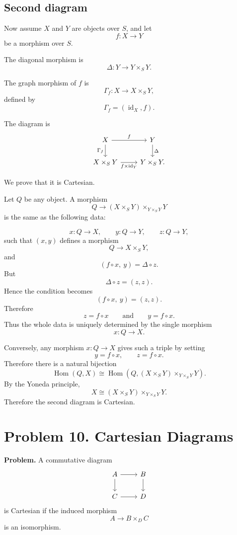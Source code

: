 \documentclass[12pt,a4paper]{article}
\theoremstyle{notespace}
\begin{document}
\subsection{Second diagram}

Now assume \(X\) and \(Y\) are objects over \(S\), and let
\[
f:X\longrightarrow Y
\]
be a morphism over \(S\).

The diagonal morphism is
\[
\Delta:Y\longrightarrow Y\times_S Y.
\]

The graph morphism of \(f\) is
\[
\Gamma_f:X\longrightarrow X\times_S Y,
\]
defined by
\[
\Gamma_f=(\operatorname{id}_X,f).
\]

The diagram is
\[
\begin{tikzcd}
	X \arrow[r,"f"] \arrow[d,"\Gamma_f"']
	&
	Y \arrow[d,"\Delta"]
	\\
	X\times_S Y \arrow[r,"f\times \operatorname{id}_Y"']
	&
	Y\times_S Y.
\end{tikzcd}
\]

We prove that it is Cartesian.

Let \(Q\) be any object. A morphism
\[
Q\longrightarrow
(X\times_S Y)\times_{Y\times_S Y}Y
\]
is the same as the following data:

\[
x:Q\to X,
\qquad
y:Q\to Y,
\qquad
z:Q\to Y,
\]
such that \((x,y)\) defines a morphism
\[
Q\to X\times_S Y,
\]
and
\[
(f\circ x,\ y)=\Delta\circ z.
\]
But
\[
\Delta\circ z=(z,z).
\]
Hence the condition becomes
\[
(f\circ x,\ y)=(z,z).
\]
Therefore
\[
z=f\circ x
\qquad\text{and}\qquad
y=f\circ x.
\]
Thus the whole data is uniquely determined by the single morphism
\[
x:Q\to X.
\]

Conversely, any morphism \(x:Q\to X\) gives such a triple by setting
\[
y=f\circ x,
\qquad
z=f\circ x.
\]
Therefore there is a natural bijection
\[
\operatorname{Hom}(Q,X)
\cong
\operatorname{Hom}
\left(
Q,(X\times_S Y)\times_{Y\times_S Y}Y
\right).
\]
By the Yoneda principle,
\[
X
\cong
(X\times_S Y)\times_{Y\times_S Y}Y.
\]
Therefore the second diagram is Cartesian.

\section{Problem 10. Cartesian Diagrams}

\textbf{Problem.}
A commutative diagram
\[
\begin{tikzcd}
	A \arrow[r] \arrow[d] & B \arrow[d] \\
	C \arrow[r] & D
\end{tikzcd}
\]
is Cartesian if the induced morphism
\[
A\longrightarrow B\times_D C
\]
is an isomorphism.
\end{document}
